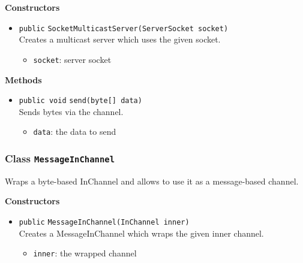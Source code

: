 \textbf{Constructors}
\begin{itemize}
\item \lstinline|public| \lstinline|SocketMulticastServer|\lstinline|(ServerSocket socket)|\\
Creates a multicast server which uses the given socket.
\begin{itemize}
\item \lstinline|socket|: server socket
\end{itemize}



\end{itemize}


\textbf{Methods}
\begin{itemize}
\item \lstinline|public void| \lstinline|send|\lstinline|(byte[] data)|\\
Sends bytes via the channel.
\begin{itemize}
\item \lstinline|data|: the data to send
\end{itemize}



\end{itemize}

\subsubsection{Class \lstinline|MessageInChannel|}
Wraps a byte-based InChannel and allows to use it as a message-based
 channel. \\





\textbf{Constructors}
\begin{itemize}
\item \lstinline|public| \lstinline|MessageInChannel|\lstinline|(InChannel inner)|\\
Creates a MessageInChannel which wraps the given inner channel.
\begin{itemize}
\item \lstinline|inner|: the wrapped channel
\end{itemize}



\end{itemize}


